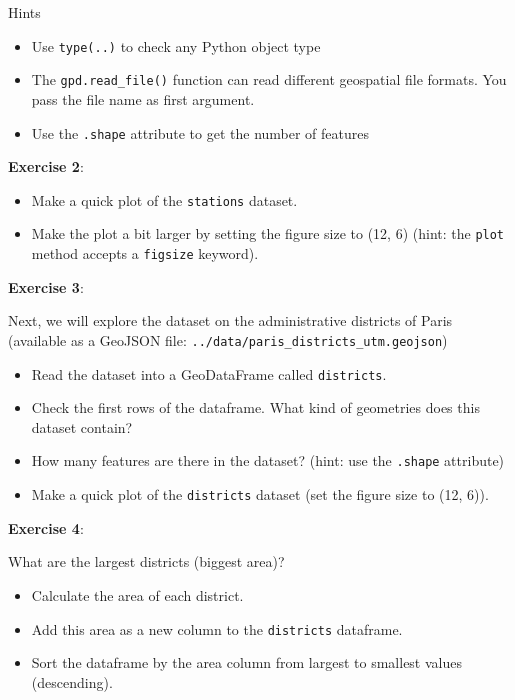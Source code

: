 \documentclass[
  letterpaper,
  DIV=11,
  numbers=noendperiod]{scrreprt}
\providecommand{\tightlist}{%
  \setlength{\itemsep}{0pt}\setlength{\parskip}{0pt}}\usepackage{longtable,booktabs,array}
\begin{document}
Hints

\begin{itemize}
\tightlist
\item
  Use \texttt{type(..)} to check any Python object type
\item
  The \texttt{gpd.read\_file()} function can read different geospatial
  file formats. You pass the file name as first argument.
\item
  Use the \texttt{.shape} attribute to get the number of features
\end{itemize}

\textbf{Exercise 2}:

\begin{itemize}
\tightlist
\item
  Make a quick plot of the \texttt{stations} dataset.
\item
  Make the plot a bit larger by setting the figure size to (12, 6)
  (hint: the \texttt{plot} method accepts a \texttt{figsize} keyword).
\end{itemize}

\textbf{Exercise 3}:

Next, we will explore the dataset on the administrative districts of
Paris (available as a GeoJSON file:
\texttt{../data/paris\_districts\_utm.geojson})

\begin{itemize}
\tightlist
\item
  Read the dataset into a GeoDataFrame called \texttt{districts}.
\item
  Check the first rows of the dataframe. What kind of geometries does
  this dataset contain?
\item
  How many features are there in the dataset? (hint: use the
  \texttt{.shape} attribute)
\item
  Make a quick plot of the \texttt{districts} dataset (set the figure
  size to (12, 6)).
\end{itemize}

\textbf{Exercise 4}:

What are the largest districts (biggest area)?

\begin{itemize}
\tightlist
\item
  Calculate the area of each district.
\item
  Add this area as a new column to the \texttt{districts} dataframe.
\item
  Sort the dataframe by the area column from largest to smallest values
  (descending).
\end{itemize}
\end{document}

